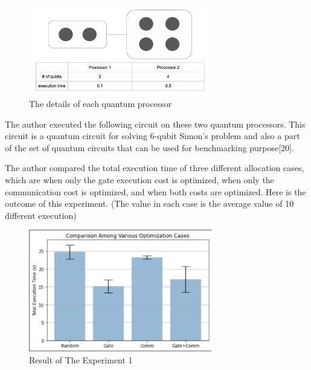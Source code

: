  \begin{figure}[h]
  		\begin{center}
  			\includegraphics[width=8cm]{img/first_experiment.png}
			\caption{The details of each quantum processor}
			\label{Fig4}
		\end{center}
	\end{figure}
 
 The author executed the following circuit on these two quantum processors.  This circuit is a quantum circuit for solving 6-qubit Simon's problem and also a part of the set of quantum circuits that can be used for benchmarking purpose[20]. 
 \newline
 \newline
  \newline
 \newline
 The author compared the total execution time of three different allocation cases, which are when only the gate execution cost is optimized, when only the communication cost is optimized, and when both costs are optimized.  Here is the outcome of this experiment.  (The value in each case is the average value of 10 different execution)
 \newpage
  \begin{figure}[h]
  		\begin{center}
  			\includegraphics[width=8cm]{img/first_experiment_plot.png}
			\caption{Result of The Experiment 1}
			\label{Fig4}
		\end{center}
	\end{figure}
 
